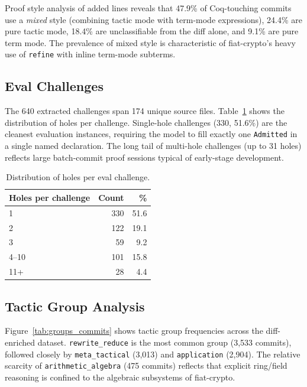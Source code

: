 \documentclass[11pt]{article}
\begin{document}
Proof style analysis of added lines reveals that 47.9\% of Coq-touching commits use a \textit{mixed} style (combining tactic mode with term-mode expressions), 24.4\% are pure tactic mode, 18.4\% are unclassifiable from the diff alone, and 9.1\% are pure term mode. The prevalence of mixed style is characteristic of fiat-crypto's heavy use of \texttt{refine} with inline term-mode subterms.

\subsection{Eval Challenges}

The 640 extracted challenges span 174 unique source files. Table~\ref{tab:holes} shows the distribution of holes per challenge. Single-hole challenges (330, 51.6\%) are the cleanest evaluation instances, requiring the model to fill exactly one \texttt{Admitted} in a single named declaration. The long tail of multi-hole challenges (up to 31 holes) reflects large batch-commit proof sessions typical of early-stage development.

\begin{table}[h]
\centering
\caption{Distribution of holes per eval challenge.}
\label{tab:holes}
\begin{tabular}{lrr}
\toprule
Holes per challenge & Count & \% \\
\midrule
1 & 330 & 51.6 \\
2 & 122 & 19.1 \\
3 & 59 & 9.2 \\
4--10 & 101 & 15.8 \\
11+ & 28 & 4.4 \\
\bottomrule
\end{tabular}
\end{table}

\subsection{Tactic Group Analysis}

Figure~\ref{tab:groups_commits} shows tactic group frequencies across the diff-enriched dataset. \texttt{rewrite\_reduce} is the most common group (3,533 commits), followed closely by \texttt{meta\_tactical} (3,013) and \texttt{application} (2,904). The relative scarcity of \texttt{arithmetic\_algebra} (475 commits) reflects that explicit ring/field reasoning is confined to the algebraic subsystems of fiat-crypto.
\end{document}

